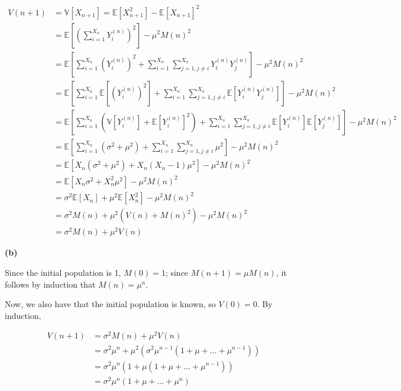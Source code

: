 \begin{align*}
V(n + 1) &= \mathbb{V}[X_{n + 1}] = \mathbb{E}[X_{n + 1}^{2}] - \mathbb{E}[X_{n + 1}]^{2} \\
&= \mathbb{E}\left[\left( \sum_{i = 1}^{X_{n}} Y_{i}^{(n)} \right)^{2}\right] - \mu^{2} M(n)^{2} \\
&= \mathbb{E}\left[ \sum_{i = 1}^{X_{n}} \left( Y_{i}^{(n)} \right)^{2} + \sum_{i = 1}^{X_{n}} \sum_{j = 1, j \neq i}^{X_{n}} Y_{i}^{(n)} Y_{j}^{(n)} \right] - \mu^{2} M(n)^{2} \\
&= \mathbb{E}\left[ \sum_{i = 1}^{X_{n}} \mathbb{E}\left[\left( Y_{i}^{(n)} \right)^{2}\right] + \sum_{i = 1}^{X_{n}} \sum_{j = 1, j \neq i}^{X_{n}} \mathbb{E}\left[ Y_{i}^{(n)} Y_{j}^{(n)} \right] \right] - \mu^{2} M(n)^{2} \\
&= \mathbb{E}\left[ \sum_{i = 1}^{X_{n}} \left( \mathbb{V}[Y_{i}^{(n)}] +  \mathbb{E}\left[ Y_{i}^{(n)} \right]^{2} \right) + \sum_{i = 1}^{X_{n}} \sum_{j = 1, j \neq i}^{X_{n}} \mathbb{E}\left[ Y_{i}^{(n)} \right] \mathbb{E} \left[ Y_{j}^{(n)} \right] \right] - \mu^{2} M(n)^{2} \\
&= \mathbb{E}\left[ \sum_{i = 1}^{X_{n}} \left( \sigma^{2} + \mu^{2} \right) + \sum_{i = 1}^{X_{n}} \sum_{j = 1, j \neq i}^{X_{n}} \mu^{2} \right] - \mu^{2} M(n)^{2} \\
&= \mathbb{E} \left[ X_{n} (\sigma^{2} + \mu^{2}) + X_{n} (X_{n} - 1) \mu^{2} \right] - \mu^{2} M(n)^{2} \\
&= \mathbb{E} \left[ X_{n} \sigma^{2} + X_{n}^{2} \mu^{2} \right] - \mu^{2} M(n)^{2} \\
&= \sigma^{2} \mathbb{E} [ X_{n} ] + \mu^{2} \mathbb{E} [ X_{n}^{2} ] - \mu^{2} M(n)^{2} \\
&= \sigma^{2} M(n) + \mu^{2} (V(n) + M(n)^{2}) - \mu^{2} M(n)^{2} \\
&= \sigma^{2} M(n) + \mu^{2} V(n)
\end{align*}

\textbf{(b)}

Since the initial population is 1, \(M(0) = 1\); since
\(M(n + 1) = \mu M(n)\), it follows by induction that \(M(n) = \mu^{n}\).

Now, we also have that the initial population is known, so \(V(0) = 0\).
By induction,

\begin{align*}
V(n + 1) &= \sigma^{2} M(n) + \mu^{2} V(n) \\
&= \sigma^{2} \mu^{n} + \mu^{2} \left( \sigma^{2} \mu^{n - 1} \left( 1 + \mu + \dots + \mu^{n - 1}\right) \right) \\
&= \sigma^{2} \mu^{n} \left(1 + \mu \left( 1 + \mu + \dots + \mu^{n - 1} \right) \right) \\
&= \sigma^{2} \mu^{n} \left(1 + \mu + \dots + \mu^{n} \right)
\end{align*}

